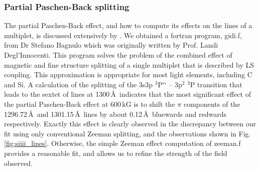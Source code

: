 \documentclass[fleqn,usenatbib]{mnras}
\newcommand{\bs}{\ensuremath{\langle \vert B \vert \rangle}}
\begin{document}

\subsubsection{Partial Paschen-Back splitting}

The partial Paschen-Back effect, and how to compute its effects on the lines of a multiplet, is discussed extensively by \citet[][Sec. 3.4]{landideglinnocenti+landolfi04-1}. We obtained a {\sc fortran} program, {\sc gidi.f}, from Dr Stefano Bagnulo which was originally written by Prof. Landi Degl'Innocenti. This program solves the problem of the combined effect of magnetic and fine structure splitting of a single multiplet that is described by LS coupling. This approximation is appropriate for most light elements, including C and Si. A calculation of the splitting of the 3s3p $^3$P$^{\rm o}$ -- 3p$^2$ $^3$P transition that leads to the sextet of lines at 1300\,\AA\ indicates that the most significant effect of the partial Paschen-Back effect at 600\,kG is to shift the $\pi$ components of the 1296.72\,\AA\ and 1301.15\,\AA\ lines by about 0.12\,\AA\ bluewards and redwards respectively. Exactly this effect is clearly observed in the discrepancy between our fit using only conventional Zeeman splitting, and the observations shown in Fig.\,\ref{fig:siiii_lines}. Otherwise, the simple Zeeman effect computation of {\sc zeeman.f} provides a reasonable fit, and allows us to refine the strength of the field observed.

\end{document}

